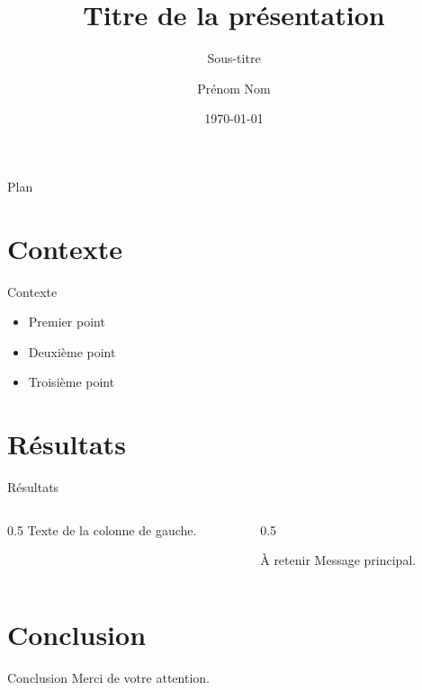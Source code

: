 \documentclass[11pt]{beamer}
\title{Titre de la présentation}
\subtitle{Sous-titre}
\author{Prénom Nom}
\institute{Établissement}
\date{\today}
\begin{document}
\begin{frame}
  \titlepage
\end{frame}

\begin{frame}{Plan}
  \tableofcontents
\end{frame}

\section{Contexte}
\begin{frame}{Contexte}
  \begin{itemize}
    \item Premier point
    \item Deuxième point
    \item Troisième point
  \end{itemize}
\end{frame}

\section{Résultats}
\begin{frame}{Résultats}
  \begin{columns}
    \begin{column}{0.5\textwidth}
      Texte de la colonne de gauche.
    \end{column}
    \begin{column}{0.5\textwidth}
      \begin{block}{À retenir}
        Message principal.
      \end{block}
    \end{column}
  \end{columns}
\end{frame}

\section{Conclusion}
\begin{frame}{Conclusion}
  Merci de votre attention.
\end{frame}
\end{document}
